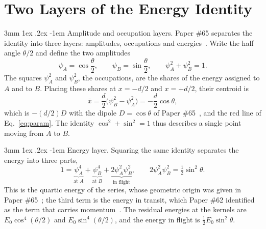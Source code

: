 \documentclass[%
 reprint, amsmath,amssymb, aps, prb, ]{revtex4-2}
\makeatletter
\numberwithin{equation}{section}
\renewcommand\paragraph{%
  \@startsection{paragraph}{4}{\z@}%
    {3mm \@plus 1ex \@minus .2ex}%
    {-1em}%
    {\normalfont\normalsize\itshape}}
\makeatother
\begin{document}
\section{Two Layers of the Energy Identity}
\label{sec:identity}

\paragraph{Amplitude and occupation layers.} Paper \#65 separates the identity into three layers: amplitudes, occupations and energies~\cite{H65}. Write the half angle $\theta/2$ and define the two amplitudes
\begin{equation}
\psi_A = \cos\frac{\theta}{2}, \qquad \psi_B = \sin\frac{\theta}{2}, \qquad \psi_A^2 + \psi_B^2 = 1 .
\label{eq:amp}
\end{equation}
The squares $\psi_A^2$ and $\psi_B^2$, the occupations, are the shares of the energy assigned to $A$ and to $B$. Placing these shares at $x = -d/2$ and $x = +d/2$, their centroid is
\begin{equation}
\bar{x} = \frac{d}{2}\big(\psi_B^2 - \psi_A^2\big) = -\frac{d}{2}\cos\theta ,
\label{eq:centroid}
\end{equation}
which is $-(d/2)D$ with the dipole $D = \cos\theta$ of Paper \#65~\cite{H65}, and the red line of Eq.~\eqref{eq:param}. The identity $\cos^2 + \sin^2 = 1$ thus describes a single point moving from $A$ to $B$.

\paragraph{Energy layer.} Squaring the same identity separates the energy into three parts,
\begin{equation}
1 = \underbrace{\psi_A^4}_{\text{at }A} + \underbrace{\psi_B^4}_{\text{at }B} + \underbrace{2\psi_A^2\psi_B^2}_{\text{in flight}},
\qquad 2\psi_A^2\psi_B^2 = \tfrac12\sin^2\theta .
\label{eq:quartic}
\end{equation}
This is the quartic energy of the series, whose geometric origin was given in Paper \#65~\cite{H65}; the third term is the energy in transit, which Paper \#62 identified as the term that carries momentum~\cite{H62}. The residual energies at the kernels are $E_0\cos^4(\theta/2)$ and $E_0\sin^4(\theta/2)$, and the energy in flight is $\tfrac12E_0\sin^2\theta$.
\end{document}
